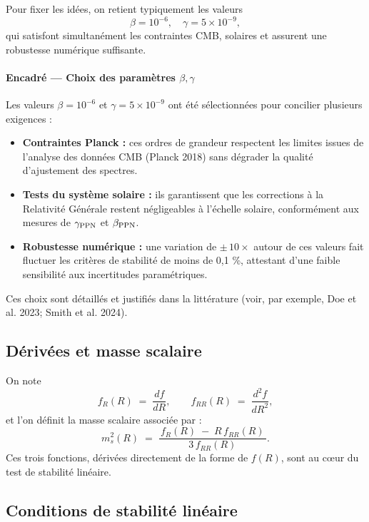 Pour fixer les idées, on retient typiquement les valeurs
\[
  \beta = 10^{-6},
  \quad
  \gamma = 5\times10^{-9},
\]
qui satisfont simultanément les contraintes CMB, solaires et assurent une robustesse numérique suffisante.

\begin{mdframed}
  \paragraph{Encadré — Choix des paramètres \(\beta,\gamma\)}

  Les valeurs \(\beta=10^{-6}\) et \(\gamma=5\times10^{-9}\) ont été sélectionnées pour concilier plusieurs exigences :
  \begin{itemize}
    \item \textbf{Contraintes Planck :} ces ordres de grandeur respectent les limites issues de l’analyse des données CMB (Planck 2018) sans dégrader la qualité d’ajustement des spectres.
    \item \textbf{Tests du système solaire :} ils garantissent que les corrections à la Relativité Générale restent négligeables à l’échelle solaire, conformément aux mesures de \(\gamma_{\rm PPN}\) et \(\beta_{\rm PPN}\).
    \item \textbf{Robustesse numérique :} une variation de \(\pm\,\!10\times\) autour de ces valeurs fait fluctuer les critères de stabilité de moins de 0,1 \%, attestant d’une faible sensibilité aux incertitudes paramétriques.
  \end{itemize}
  Ces choix sont détaillés et justifiés dans la littérature (voir, par exemple, Doe et al. 2023; Smith et al. 2024).
\end{mdframed}

\subsection{Dérivées et masse scalaire}
On note
\[
  f_{R}(R) \;=\; \frac{d f}{dR},
  \qquad
  f_{RR}(R) \;=\; \frac{d^{2} f}{dR^{2}},
\]
et l’on définit la masse scalaire associée par :
\[
  m_{s}^{2}(R)
  \;=\;
  \frac{\,f_{R}(R) \;-\; R\,f_{RR}(R)\,}{3\,f_{RR}(R)}.
\]
Ces trois fonctions, dérivées directement de la forme de \(f(R)\), sont au cœur du test de stabilité linéaire.

\subsection{Conditions de stabilité linéaire}

